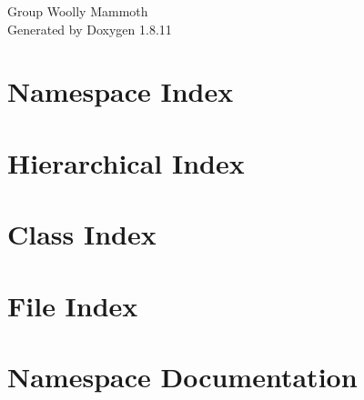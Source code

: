 \documentclass[twoside]{book}
\newcommand{\+}{\discretionary{\mbox{\scriptsize$\hookleftarrow$}}{}{}}
\newcommand{\clearemptydoublepage}{%
  \newpage{\pagestyle{empty}\cleardoublepage}%
}
\begin{document}
\hypersetup{pageanchor=false,
             bookmarksnumbered=true,
             pdfencoding=unicode
            }
\begin{titlepage}
\vspace*{7cm}
\begin{center}%
{\Large Group Woolly Mammoth }\\
\vspace*{1cm}
{\large Generated by Doxygen 1.8.11}\\
\end{center}
\end{titlepage}
\clearemptydoublepage
\tableofcontents
\clearemptydoublepage
{}
\hypersetup{pageanchor=true}

\chapter{Namespace Index}

\chapter{Hierarchical Index}

\chapter{Class Index}

\chapter{File Index}

\chapter{Namespace Documentation}




\end{document}
